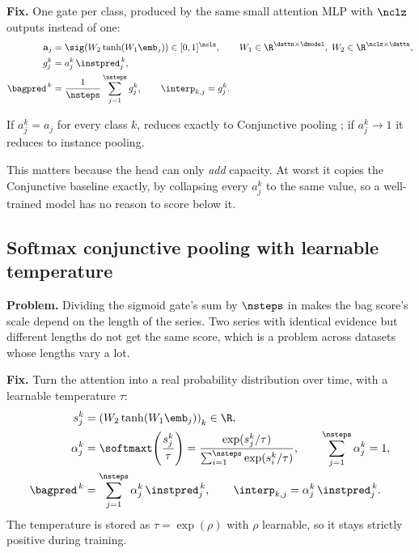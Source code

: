 \textbf{Fix.} One gate per class, produced by the same small attention MLP with $\nclz$ outputs
instead of one:
\begin{align}
  \mathbf{a}_j &= \sig\!\left(W_2 \tanh(W_1 \emb_j)\right) \in [0,1]^{\nclz},
  \qquad W_1 \in \R^{\dattn \times \dmodel},\; W_2 \in \R^{\nclz \times \dattn},
  \label{eq:cw_gate}\\
  g_j^k &= a_j^k \, \instpred_j^{\,k},
  \label{eq:cw_evidence}\\
  \bagpred^{\,k} &= \frac{1}{\nsteps}\sum_{j=1}^{\nsteps} g_j^k,
  \qquad
  \interp_{k,j} = g_j^k .
  \label{eq:cw_bag}
\end{align}

\begin{property}
\label{prop:cw}
If $a_j^k = a_j$ for every class $k$,  reduces exactly to Conjunctive pooling
; if $a_j^k \to 1$ it reduces to instance pooling.
\end{property}

This matters because the head can only \emph{add} capacity. At worst it copies the Conjunctive
baseline exactly, by collapsing every $a_j^k$ to the same value, so a well-trained model has no
reason to score below it.

\subsection{Softmax conjunctive pooling with learnable temperature}
\label{sec:pool:softmax}

\textbf{Problem.} Dividing the sigmoid gate's sum by $\nsteps$ in  makes the bag
score's scale depend on the length of the series. Two series with identical evidence but different
lengths do not get the same score, which is a problem across datasets whose lengths vary a lot.

\textbf{Fix.} Turn the attention into a real probability distribution over time, with a learnable
temperature $\tau$:
\begin{align}
  s_j^k     &= \left(W_2 \tanh(W_1 \emb_j)\right)_k \in \R,
  \label{eq:sm_score}\\
  \alpha_j^k &= \softmaxt\!\left(\frac{s_j^k}{\tau}\right)
              = \frac{\exp(s_j^k/\tau)}{\sum_{i=1}^{\nsteps}\exp(s_i^k/\tau)},
  \qquad \sum_{j=1}^{\nsteps}\alpha_j^k = 1,
  \label{eq:sm_alpha}\\
  \bagpred^{\,k} &= \sum_{j=1}^{\nsteps} \alpha_j^k \, \instpred_j^{\,k},
  \qquad
  \interp_{k,j} = \alpha_j^k \, \instpred_j^{\,k}.
  \label{eq:sm_bag}
\end{align}
The temperature is stored as $\tau = \exp(\rho)$ with $\rho$ learnable, so it stays strictly
positive during training.

